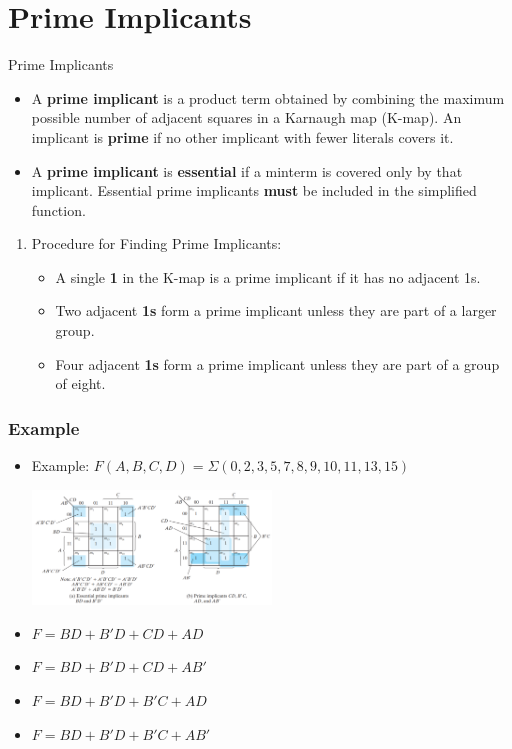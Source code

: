 \documentclass[Serif, 10pt, brown]{beamer}
\theoremstyle{example}
\theoremstyle{plain}
\begin{document}
\section[Prime Implicants]{Prime Implicants}
\begin{frame}{Prime Implicants}
	\begin{itemize}
	    \item A \textbf{prime implicant} is a product term obtained by combining the maximum possible number of adjacent squares in a Karnaugh map (K-map). An implicant is \textbf{prime} if no other implicant with fewer literals covers it.
        \item A \textbf{prime implicant} is \textbf{essential} if a minterm is covered only by that implicant. Essential prime implicants \textbf{must} be included in the simplified function.
	\end{itemize}
    \begin{enumerate}
        \item Procedure for Finding Prime Implicants:
    
\begin{itemize}
    \item A single \textbf{1} in the K-map is a prime implicant if it has no adjacent 1s.
    \item Two adjacent \textbf{1s} form a prime implicant unless they are part of a larger group.
    \item Four adjacent \textbf{1s} form a prime implicant unless they are part of a group of eight.
\end{itemize}
\end{enumerate}
\end{frame}
\begin{frame}
	\frametitle{Example}
    \begin{itemize}
       \item Example: \( F(A,B,C,D) = \Sigma(0,2,3,5,7,8,9,10,11,13,15)\)
       \begin{center}
        \includegraphics[width=0.5\textwidth]{figs/pr.png}
    \end{center}
    \item \( F  = BD + B'D + CD + AD\)
    \item \( F  = BD + B'D + CD + AB'\)
    \item \( F  = BD + B'D + B'C + AD\)
    \item \( F  = BD + B'D + B'C + AB'\)
    \end{itemize}
\end{frame}
\end{document}
